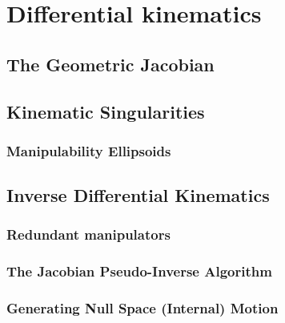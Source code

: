 \section{Differential kinematics}

\subsection{The Geometric Jacobian}

\subsection{Kinematic Singularities}

\subsubsection{Manipulability Ellipsoids}

\subsection{Inverse Differential Kinematics}

\subsubsection{Redundant manipulators}

\subsubsection{The Jacobian Pseudo-Inverse Algorithm}

\subsubsection{Generating Null Space (Internal) Motion}
